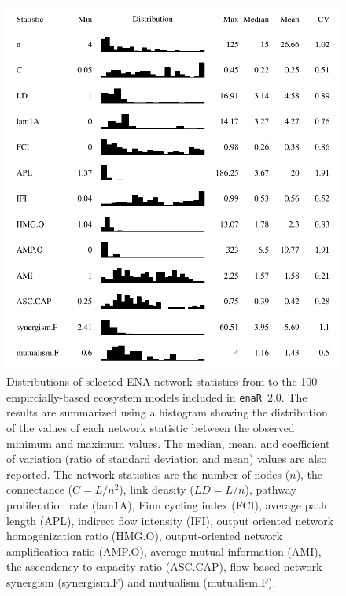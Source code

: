 \documentclass[11pt]{article}
\newcommand{\enaR}{\texttt{enaR}}
\begin{document}
\begin{figure}[t]
\includegraphics[scale=1]{../figures/ns_dist.pdf}
\caption{Distributions of selected ENA network statistics from to the
  100 empircially-based ecosystem models included in \enaR\ 2.0.  The
  results are summarized using a histogram showing the distribution of
  the values of each network statistic between the observed minimum
  and maximum values.  The median, mean, and coefficient of variation
  (ratio of standard deviation and mean) values are also reported.
  The network statistics are the number of nodes ($n$), the
  connectance ($C = L/n^2$), link density ($LD = L/n$), pathway
  proliferation rate (lam1A), Finn cycling index (FCI), average path
  length (APL), indirect flow intensity (IFI), output oriented network
  homogenization ratio (HMG.O), output-oriented network amplification
  ratio (AMP.O), average mutual information (AMI), the
  ascendency-to-capacity ratio (ASC.CAP), flow-based network synergism
  (synergism.F) and mutualism (mutualism.F).} \label{fig:ns}
\end{figure}
\end{document}
